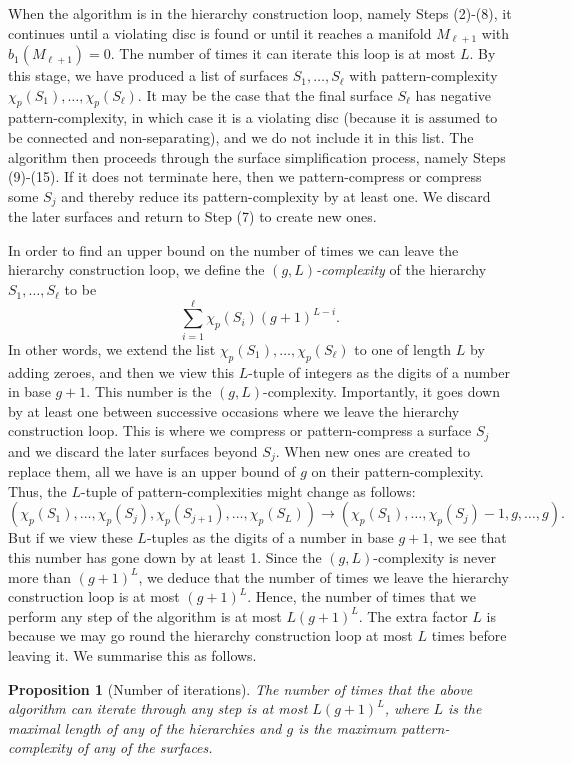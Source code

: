 \documentclass[oneside]{amsart}
\numberwithin{equation}{section}
\theoremstyle{plain}
\newtheorem{proposition}[equation]{Proposition}
\theoremstyle{definition}
\begin{document}
When the algorithm is in the hierarchy construction loop, namely Steps (2)-(8), it continues until a violating disc is found or until it reaches a manifold $M_{\ell+1}$ with $b_1(M_{\ell+1}) = 0$. The number of times it can iterate this loop is at most $L$. By this stage, we have produced a list of surfaces $S_1, \dots, S_\ell$ with pattern-complexity $\chi_p(S_1), \dots, \chi_p(S_\ell)$. It may be the case that the final surface $S_\ell$ has negative pattern-complexity, in which case it is a violating disc (because it is assumed to be connected and non-separating), and we do not include it in this list. The algorithm then proceeds through the surface simplification process, namely Steps (9)-(15). If it does not terminate here, then we pattern-compress or compress some $S_j$ and thereby reduce its pattern-complexity by at least one. We discard the later surfaces and return to Step (7) to create new ones.

In order to find an upper bound on the number of times we can leave the hierarchy construction loop, we define the {\sl $(g,L)$-complexity} of the hierarchy $S_1, \dots, S_\ell$ to be 
$$\sum_{i=1}^\ell \chi_p(S_i) (g+1)^{L-i}.$$
In other words, we extend the list $\chi_p(S_1), \dots, \chi_p(S_\ell)$ to one of length $L$ by adding zeroes, and then we view this $L$-tuple of integers as the digits of a number in base $g+1$. This number is the $(g,L)$-complexity. Importantly, it goes down by at least one between successive occasions where we leave the hierarchy construction loop. This is where we compress or pattern-compress a surface $S_j$ and we discard the later surfaces beyond $S_j$. When new ones are created to replace them, all we have is an upper bound of $g$ on their pattern-complexity. Thus, the $L$-tuple of pattern-complexities might change as follows:
$$(\chi_p(S_1), \dots, \chi_p(S_j), \chi_p(S_{j+1}), \dots, \chi_p(S_L)) \longrightarrow (\chi_p(S_1), \dots, \chi_p(S_j) -1, g, \dots, g).$$
But if we view these $L$-tuples as the digits of a number in base $g+1$, we see that this number has gone down by at least 1.
Since the $(g,L)$-complexity is never more than $(g+1)^L$, we deduce that the number of times we leave the hierarchy construction loop is at most $(g+1)^L$. Hence, the number of times that we perform any step of the algorithm is at most $L (g+1)^L$. The extra factor $L$ is because we may go round the hierarchy construction loop at most $L$ times before leaving it. We summarise this as follows.

\begin{proposition}[Number of iterations]
\label{Prop:UpperBoundRunningTime}
The number of times that the above algorithm can iterate through any step is at most $L (g+1)^L$, where $L$ is the maximal length of any of the hierarchies and $g$ is the maximum pattern-complexity of any of the surfaces.
\end{proposition}
\end{document}
